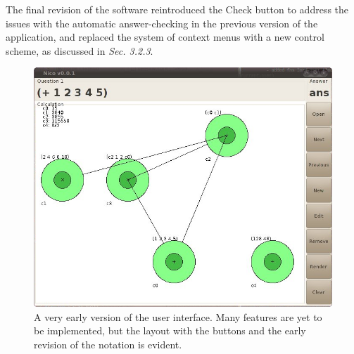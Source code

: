 \documentclass[12pt,twoside,notitlepage,xetex]{report}
\begin{document}
The final revision of the software reintroduced the {\sfapp Check} button to address the issues with the automatic answer-checking in the previous version of the application, and replaced the system of context menus with a new control scheme, as discussed in \emph{Sec. 3.2.3}.

\begin{center}
\begin{figure}[H]
\begin{center}
\includegraphics[width=\textwidth-4cm]{figs/nico_screen_oldest.png}
\end{center}
\caption{A very early version of the user interface.  Many features are yet to be implemented, but the layout with the buttons and the early revision of the notation is evident.}
\label{fig:OldApps1}
\end{figure}
\end{center}
\end{document}

